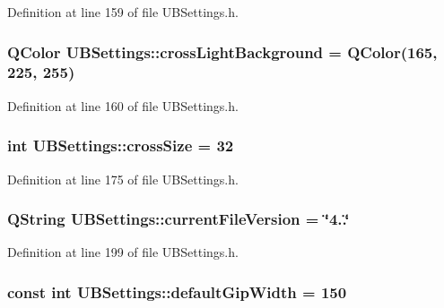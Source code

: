 Definition at line 159 of file U\-B\-Settings.\-h.

\hypertarget{class_u_b_settings_a0c8533421b3460c374d4a19a716b2a8a}{
\subsubsection[{cross\-Light\-Background}]{\setlength{\rightskip}{0pt plus 5cm}Q\-Color U\-B\-Settings\-::cross\-Light\-Background = Q\-Color(165, 225, 255)\hspace{0.3cm}{\ttfamily [static]}}}\label{db/d66/class_u_b_settings_a0c8533421b3460c374d4a19a716b2a8a}


Definition at line 160 of file U\-B\-Settings.\-h.

\hypertarget{class_u_b_settings_ae97d3bcabc04a1efbad5ff97032790ef}{
\subsubsection[{cross\-Size}]{\setlength{\rightskip}{0pt plus 5cm}int U\-B\-Settings\-::cross\-Size = 32\hspace{0.3cm}{\ttfamily [static]}}}\label{db/d66/class_u_b_settings_ae97d3bcabc04a1efbad5ff97032790ef}


Definition at line 175 of file U\-B\-Settings.\-h.

\hypertarget{class_u_b_settings_a3aa1126a8aaeb41a39c42a9952ba3cdd}{
\subsubsection[{current\-File\-Version}]{\setlength{\rightskip}{0pt plus 5cm}Q\-String U\-B\-Settings\-::current\-File\-Version = \char`\"{}4..\char`\"{}\hspace{0.3cm}{\ttfamily [static]}}}\label{db/d66/class_u_b_settings_a3aa1126a8aaeb41a39c42a9952ba3cdd}


Definition at line 199 of file U\-B\-Settings.\-h.

\hypertarget{class_u_b_settings_a1d48ed74e578e328b7299fea054fa5f5}{
\subsubsection[{default\-Gip\-Width}]{\setlength{\rightskip}{0pt plus 5cm}const int U\-B\-Settings\-::default\-Gip\-Width = 150\hspace{0.3cm}{\ttfamily [static]}}}\label{db/d66/class_u_b_settings_a1d48ed74e578e328b7299fea054fa5f5}


